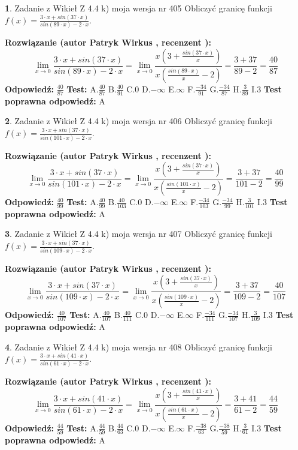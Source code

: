 \documentclass[12pt, a4paper]{article}
\theoremstyle{definition} %
\newtheorem{zad}{}
\newcommand{\zadStart}[1]{\begin{zad}#1\newline}
\newcommand{\zadStop}{\end{zad}}
\newcommand{\rozwStart}[2]{\noindent \textbf{Rozwiązanie (autor #1 , recenzent #2): }\newline}
\newcommand{\rozwStop}{\newline}
\newcommand{\odpStart}{\noindent \textbf{Odpowiedź:}\newline}
\newcommand{\odpStop}{\newline}
\newcommand{\testStart}{\noindent \textbf{Test:}\newline}
\newcommand{\testStop}{\newline}
\newcommand{\kluczStart}{\noindent \textbf{Test poprawna odpowiedź:}\newline}
\newcommand{\kluczStop}{\newline}
\begin{document}
\zadStart{Zadanie z Wikieł Z 4.4 k) moja wersja nr 405}
Obliczyć granicę funkcji $f(x)=\frac{3\cdot x +sin(37\cdot x)}{sin(89\cdot x) -2\cdot x}$.
\zadStop
\rozwStart{Patryk Wirkus}{}
$$\lim\limits_{x\to 0}\frac{3\cdot x +sin(37\cdot x)}{sin(89\cdot x) -2\cdot x}
=\lim\limits_{x\to 0}\frac{x(3+\frac{sin(37\cdot x)}{x})}{x(\frac{sin(89\cdot x)}{x}-2)}
=\frac{3+37}{89-2} = \frac{40}{87}$$
\rozwStop
\odpStart
$\frac{40}{87}$
\odpStop
\testStart
A.$\frac{40}{87}$
B.$\frac{40}{91}$
C.$0$
D.$-\infty$
E.$\infty$
F.$\frac{-34}{91}$
G.$\frac{-34}{87}$
H.$\frac{3}{89}$
I.$3$
\testStop
\kluczStart
A
\kluczStop



\zadStart{Zadanie z Wikieł Z 4.4 k) moja wersja nr 406}
Obliczyć granicę funkcji $f(x)=\frac{3\cdot x +sin(37\cdot x)}{sin(101\cdot x) -2\cdot x}$.
\zadStop
\rozwStart{Patryk Wirkus}{}
$$\lim\limits_{x\to 0}\frac{3\cdot x +sin(37\cdot x)}{sin(101\cdot x) -2\cdot x}
=\lim\limits_{x\to 0}\frac{x(3+\frac{sin(37\cdot x)}{x})}{x(\frac{sin(101\cdot x)}{x}-2)}
=\frac{3+37}{101-2} = \frac{40}{99}$$
\rozwStop
\odpStart
$\frac{40}{99}$
\odpStop
\testStart
A.$\frac{40}{99}$
B.$\frac{40}{103}$
C.$0$
D.$-\infty$
E.$\infty$
F.$\frac{-34}{103}$
G.$\frac{-34}{99}$
H.$\frac{3}{101}$
I.$3$
\testStop
\kluczStart
A
\kluczStop



\zadStart{Zadanie z Wikieł Z 4.4 k) moja wersja nr 407}
Obliczyć granicę funkcji $f(x)=\frac{3\cdot x +sin(37\cdot x)}{sin(109\cdot x) -2\cdot x}$.
\zadStop
\rozwStart{Patryk Wirkus}{}
$$\lim\limits_{x\to 0}\frac{3\cdot x +sin(37\cdot x)}{sin(109\cdot x) -2\cdot x}
=\lim\limits_{x\to 0}\frac{x(3+\frac{sin(37\cdot x)}{x})}{x(\frac{sin(109\cdot x)}{x}-2)}
=\frac{3+37}{109-2} = \frac{40}{107}$$
\rozwStop
\odpStart
$\frac{40}{107}$
\odpStop
\testStart
A.$\frac{40}{107}$
B.$\frac{40}{111}$
C.$0$
D.$-\infty$
E.$\infty$
F.$\frac{-34}{111}$
G.$\frac{-34}{107}$
H.$\frac{3}{109}$
I.$3$
\testStop
\kluczStart
A
\kluczStop



\zadStart{Zadanie z Wikieł Z 4.4 k) moja wersja nr 408}
Obliczyć granicę funkcji $f(x)=\frac{3\cdot x +sin(41\cdot x)}{sin(61\cdot x) -2\cdot x}$.
\zadStop
\rozwStart{Patryk Wirkus}{}
$$\lim\limits_{x\to 0}\frac{3\cdot x +sin(41\cdot x)}{sin(61\cdot x) -2\cdot x}
=\lim\limits_{x\to 0}\frac{x(3+\frac{sin(41\cdot x)}{x})}{x(\frac{sin(61\cdot x)}{x}-2)}
=\frac{3+41}{61-2} = \frac{44}{59}$$
\rozwStop
\odpStart
$\frac{44}{59}$
\odpStop
\testStart
A.$\frac{44}{59}$
B.$\frac{44}{63}$
C.$0$
D.$-\infty$
E.$\infty$
F.$\frac{-38}{63}$
G.$\frac{-38}{59}$
H.$\frac{3}{61}$
I.$3$
\testStop
\kluczStart
A
\kluczStop
\end{document}
